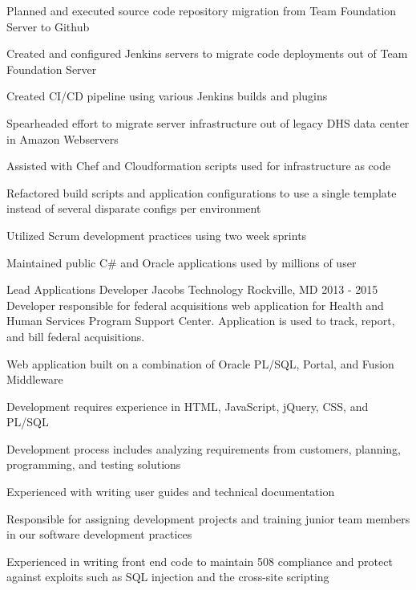 \begin{cventries}
{\begin{cvitems}
        \item {Planned and executed source code repository migration from Team Foundation Server to Github}
        \item {Created and configured Jenkins servers to migrate code deployments out of Team Foundation Server}
        \item {Created CI/CD pipeline using various Jenkins builds and plugins}
        \item {Spearheaded effort to migrate server infrastructure out of legacy DHS data center in Amazon Webservers}
        \item {Assisted with Chef and Cloudformation scripts used for infrastructure as code}
        \item {Refactored build scripts and application configurations to use a single template instead of several disparate configs per environment}
        \item {Utilized Scrum development practices using two week sprints}
        \item {Maintained public C\# and Oracle applications used by millions of user}
      \end{cvitems}
    }

  \cventrysix
    {Lead Applications Developer} %
    {Jacobs Technology} %
    {Rockville, MD} %
    {2013 - 2015} %
    {Developer responsible for federal acquisitions web application for Health and Human Services Program Support Center. Application is used to track, report, and bill federal acquisitions.} %
    {
      \begin{cvitems} %
        \item {Web application built on a combination of Oracle PL/SQL, Portal, and Fusion Middleware}
        \item {Development requires experience in HTML, JavaScript, jQuery, CSS, and PL/SQL}
        \item {Development process includes analyzing requirements from customers, planning, programming, and testing solutions}
        \item {Experienced with writing user guides and technical documentation}
        \item {Responsible for assigning development projects and training junior team members in our software development practices}
        \item {Experienced in writing front end code to maintain 508 compliance and protect against exploits such as SQL injection and the cross-site scripting}
      \end{cvitems}
    }


\end{cventries}
